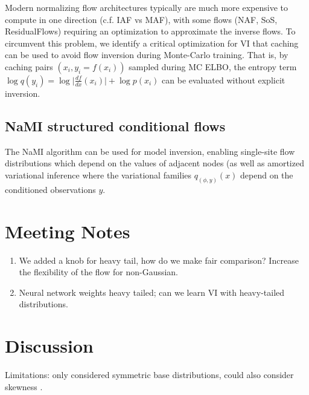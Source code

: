 \documentclass{scrartcl}
\theoremstyle{definition}
\begin{document}
Modern normalizing flow architectures typically
are much more expensive to compute in one direction (c.f. IAF vs MAF), with
some flows (NAF, SoS, ResidualFlows) requiring an optimization to approximate
the inverse flows. To circumvent this problem, we identify a critical optimization
for VI that caching can be used to avoid flow inversion during Monte-Carlo training.
That is, by caching pairs $(x_i, y_i = f(x_i))$ sampled during MC ELBO,
the entropy term $\log q(y_i) = \log \lvert \frac{df}{dx}(x_i) \rvert + \log p(x_i)$
can be evaluated without explicit inversion.


\subsection{NaMI structured conditional flows}

The NaMI algorithm \cite{webb2017faithful} can be used for model inversion, enabling
single-site flow distributions which depend on the values of adjacent nodes (as well as
amortized variational inference where the variational families $q_{(\phi,y)}(x)$
depend on the conditioned observations $y$.


\section{Meeting Notes}

\begin{enumerate}
    \item We added a knob for heavy tail, how do we make fair comparison? Increase the flexibility of the flow for non-Gaussian.
    \item Neural network weights heavy tailed; can we learn VI with heavy-tailed distributions.
\end{enumerate}

\section{Discussion}

Limitations: only considered symmetric base distributions, could also consider skewness \citep{gupta2003multivariate}.


\end{document}
